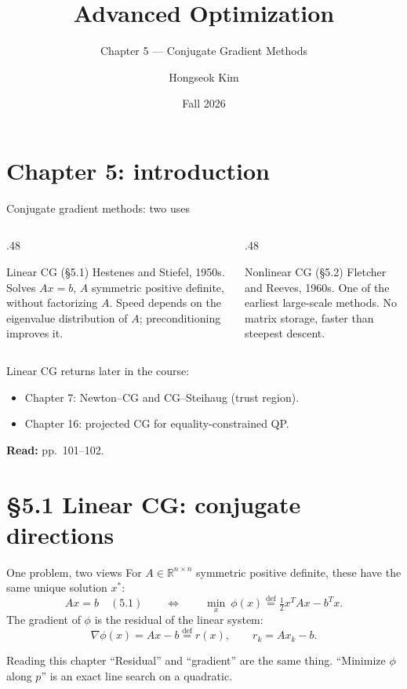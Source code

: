 \documentclass[12pt,aspectratio=169]{beamer}
\title{Advanced Optimization}
\subtitle{Chapter 5 --- Conjugate Gradient Methods}
\author{Hongseok Kim}
\institute{Department of Electronic Engineering, Sogang University}
\date{Fall 2026}
\newcommand{\readpp}[1]{{\color{red!80!black}\textbf{Read:} #1}}
\newcommand{\R}{\mathbb{R}}
\begin{document}
\section{Chapter 5: introduction}

\begin{frame}
  \titlepage
\end{frame}

\begin{frame}{Conjugate gradient methods: two uses}
  \begin{columns}[T]
    \begin{column}{.48\textwidth}
      \begin{block}{Linear CG (\S5.1)}
        Hestenes and Stiefel, 1950s.
        Solves $Ax=b$, $A$ symmetric positive definite, without factorizing $A$.
        Speed depends on the \alert{eigenvalue distribution} of $A$; preconditioning improves it.
      \end{block}
    \end{column}
    \begin{column}{.48\textwidth}
      \begin{block}{Nonlinear CG (\S5.2)}
        Fletcher and Reeves, 1960s.
        One of the earliest large-scale methods.
        No matrix storage, faster than steepest descent.
      \end{block}
    \end{column}
  \end{columns}
  \vspace{1ex}
  Linear CG returns later in the course:
  \begin{itemize}
    \item Chapter 7: Newton--CG and CG--Steihaug (trust region).
    \item Chapter 16: projected CG for equality-constrained QP.
  \end{itemize}
  \readpp{pp.~101--102.}
\end{frame}

\section{\S5.1 Linear CG: conjugate directions}

\begin{frame}{One problem, two views}
  For $A\in\R^{n\times n}$ symmetric positive definite, these have the same unique solution $x^*$:
  \begin{equation}
    Ax=b \quad (5.1) \qquad\Longleftrightarrow\qquad
    \min_x\ \phi(x) \overset{\text{def}}{=} \tfrac12x^TAx-b^Tx. \tag{5.2}
  \end{equation}
  The gradient of $\phi$ is the residual of the linear system:
  \begin{equation}
    \nabla\phi(x) = Ax-b \overset{\text{def}}{=} r(x), \qquad r_k = Ax_k-b. \tag{5.3, 5.4}
  \end{equation}
  \begin{block}{Reading this chapter}
    ``Residual'' and ``gradient'' are the same thing.
    ``Minimize $\phi$ along $p$'' is an exact line search on a quadratic.
  \end{block}
\end{frame}
\end{document}
